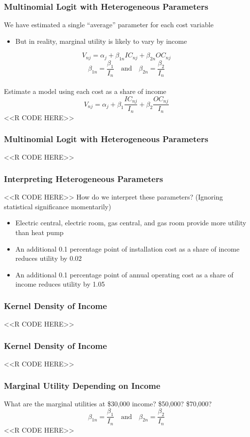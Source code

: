 \documentclass{beamer}
\begin{document}
\begin{frame}[fragile]\frametitle{Multinomial Logit with Heterogeneous Parameters}
    We have estimated a single ``average'' parameter for each cost variable
    \begin{itemize}
        \item But in reality, marginal utility is likely to vary by income
    \end{itemize}
    $$V_{nj} = \alpha_j + \beta_{1n} IC_{nj} + \beta_{2n} OC_{nj}$$
    $$\beta_{1n} = \frac{\beta_1}{I_n} \quad \text{and} \quad \beta_{2n} = \frac{\beta_2}{I_n}$$ \\
    \vspace{2ex}
    Estimate a model using each cost as a share of income
    $$V_{nj} = \alpha_j + \beta_1 \frac{IC_{nj}}{I_n} + \beta_2 \frac{OC_{nj}}{I_n}$$
    <<R CODE HERE>>
\end{frame}

\begin{frame}[fragile]\frametitle{Multinomial Logit with Heterogeneous Parameters}
    <<R CODE HERE>>
\end{frame}

\begin{frame}[fragile]\frametitle{Interpreting Heterogeneous Parameters}
    <<R CODE HERE>>
    \vspace{1ex}
    How do we interpret these parameters? (Ignoring statistical significance momentarily)
    \begin{itemize}
        \item Electric central, electric room, gas central, and gas room provide more utility than heat pump
        \item An additional 0.1 percentage point of installation cost as a share of income reduces utility by 0.02
        \item An additional 0.1 percentage point of annual operating cost as a share of income reduces utility by 1.05
    \end{itemize}
\end{frame}

\begin{frame}[fragile]\frametitle{Kernel Density of Income}
    <<R CODE HERE>>
\end{frame}

\begin{frame}[fragile]\frametitle{Kernel Density of Income}
    <<R CODE HERE>>
\end{frame}

\begin{frame}[fragile]\frametitle{Marginal Utility Depending on Income}
    What are the marginal utilities at \$30,000 income? \$50,000? \$70,000?
    $$\beta_{1n} = \frac{\beta_1}{I_n} \quad \text{and} \quad \beta_{2n} = \frac{\beta_2}{I_n}$$
    <<R CODE HERE>>
\end{frame}
\end{document}
